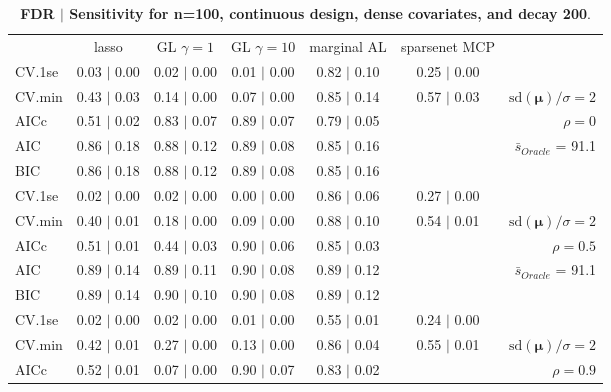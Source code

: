 \begin{table}\vspace{-.5cm}
\caption[l]{ {\it }
{ \bf FDR $\boldsymbol{\mid}$ Sensitivity for n=100, continuous design, dense covariates, and  decay  200}.}
\vspace{-.5cm}
\footnotesize{}
\begin{center}
\begin{tabular}{l*{5}{c}|r}
 & lasso & GL $\gamma=1$ & GL $\gamma=10$ & marginal AL & sparsenet MCP  & \\
 \cline{1-7}
CV.1se & 0.03 $\mid$ 0.00 & 0.02 $\mid$ 0.00 & 0.01 $\mid$ 0.00 & 0.82 $\mid$ 0.10 & 0.25 $\mid$ 0.00 & \\
CV.min & 0.43 $\mid$ 0.03 & 0.14 $\mid$ 0.00 & 0.07 $\mid$ 0.00 & 0.85 $\mid$ 0.14 & 0.57 $\mid$ 0.03 &  $\mathrm{sd}(\mathbf{\mu})/\sigma=2$ \\
AICc & 0.51 $\mid$ 0.02 & 0.83 $\mid$ 0.07 & 0.89 $\mid$ 0.07 & 0.79 $\mid$ 0.05 & & $\rho=0$ \\
AIC & 0.86 $\mid$ 0.18 & 0.88 $\mid$ 0.12 & 0.89 $\mid$ 0.08 & 0.85 $\mid$ 0.16 & &  \multirow{2}{*}{$\bar{s}_{Oracle}$ = 91.1} \\
BIC & 0.86 $\mid$ 0.18 & 0.88 $\mid$ 0.12 & 0.89 $\mid$ 0.08 & 0.85 $\mid$ 0.16 & &  \\
 \hline 
CV.1se & 0.02 $\mid$ 0.00 & 0.02 $\mid$ 0.00 & 0.00 $\mid$ 0.00 & 0.86 $\mid$ 0.06 & 0.27 $\mid$ 0.00 & \\
CV.min & 0.40 $\mid$ 0.01 & 0.18 $\mid$ 0.00 & 0.09 $\mid$ 0.00 & 0.88 $\mid$ 0.10 & 0.54 $\mid$ 0.01 &  $\mathrm{sd}(\mathbf{\mu})/\sigma=2$ \\
AICc & 0.51 $\mid$ 0.01 & 0.44 $\mid$ 0.03 & 0.90 $\mid$ 0.06 & 0.85 $\mid$ 0.03 & & $\rho=0.5$ \\
AIC & 0.89 $\mid$ 0.14 & 0.89 $\mid$ 0.11 & 0.90 $\mid$ 0.08 & 0.89 $\mid$ 0.12 & &  \multirow{2}{*}{$\bar{s}_{Oracle}$ = 91.1} \\
BIC & 0.89 $\mid$ 0.14 & 0.90 $\mid$ 0.10 & 0.90 $\mid$ 0.08 & 0.89 $\mid$ 0.12 & &  \\
 \hline 
CV.1se & 0.02 $\mid$ 0.00 & 0.02 $\mid$ 0.00 & 0.01 $\mid$ 0.00 & 0.55 $\mid$ 0.01 & 0.24 $\mid$ 0.00 & \\
CV.min & 0.42 $\mid$ 0.01 & 0.27 $\mid$ 0.00 & 0.13 $\mid$ 0.00 & 0.86 $\mid$ 0.04 & 0.55 $\mid$ 0.01 &  $\mathrm{sd}(\mathbf{\mu})/\sigma=2$ \\
AICc & 0.52 $\mid$ 0.01 & 0.07 $\mid$ 0.00 & 0.90 $\mid$ 0.07 & 0.83 $\mid$ 0.02 & & $\rho=0.9$ \\

\end{tabular}
\end{center}
\end{table}
